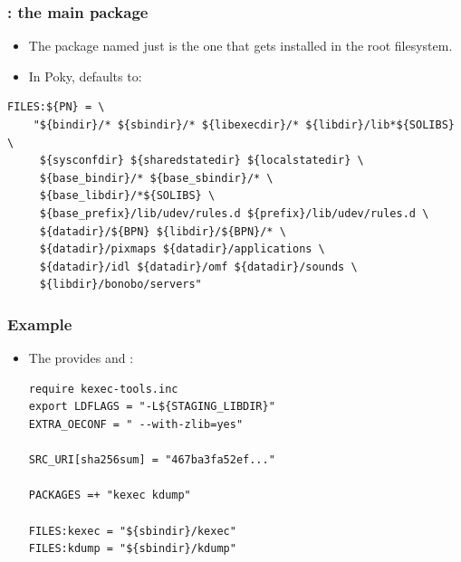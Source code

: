 \begin{frame}[fragile]
  \frametitle{: the main package}
  \begin{itemize}
    \item The package named just  is the one that gets
      installed in the root filesystem.
    \item In Poky, defaults to:
  \end{itemize}
  \begin{block}{}
    \begin{verbatim}
FILES:${PN} = \
    "${bindir}/* ${sbindir}/* ${libexecdir}/* ${libdir}/lib*${SOLIBS} \
     ${sysconfdir} ${sharedstatedir} ${localstatedir} \
     ${base_bindir}/* ${base_sbindir}/* \
     ${base_libdir}/*${SOLIBS} \
     ${base_prefix}/lib/udev/rules.d ${prefix}/lib/udev/rules.d \
     ${datadir}/${BPN} ${libdir}/${BPN}/* \
     ${datadir}/pixmaps ${datadir}/applications \
     ${datadir}/idl ${datadir}/omf ${datadir}/sounds \
     ${libdir}/bonobo/servers"
    \end{verbatim}
  \end{block}
\end{frame}

\begin{frame}[fragile]
  \frametitle{Example}
  \begin{itemize}
    \item The \code{kexec tools} provides \code{kexec} and :
    \begin{block}{}
    \begin{verbatim}
require kexec-tools.inc
export LDFLAGS = "-L${STAGING_LIBDIR}"
EXTRA_OECONF = " --with-zlib=yes"

SRC_URI[sha256sum] = "467ba3fa52ef..."

PACKAGES =+ "kexec kdump"

FILES:kexec = "${sbindir}/kexec"
FILES:kdump = "${sbindir}/kdump"
    \end{verbatim}
    \end{block}
  \end{itemize}
\end{frame}

